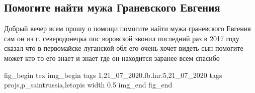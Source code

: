  
 
\subsection{Помогите найти мужа Граневского Евгения}
\label{sec:21_07_2020.fb.lnr.5}
  
Добрый вечер всем прошу о помощи помогите найти мужа граневского Евгения сам он
из г. северодонецка пос воровской звонил последний раз в 2017 году сказал что в
первомайске луганской обл его очень хочет видеть сын помогите может кто то его
знает и знает где он находится заранее всем спасибо

\ifcmt
fig_begin 
  tex \centering
  img_begin 
    tags 1,21_07_2020.fb.lnr.5,21_07_2020
    tags projs,p_saintrussia,letopis
    width 0.5
  img_end
fig_end
\fi
